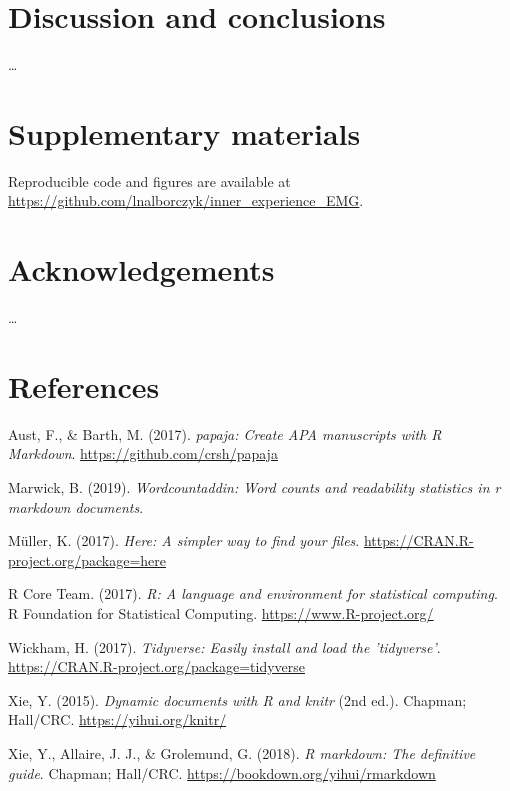 \documentclass[
  english,
  man,floatsintext]{apa6}
\newlength{\cslhangindent}
\newenvironment{cslreferences}%
  {\setlength{\parindent}{0pt}%
  \everypar{\setlength{\hangindent}{\cslhangindent}}\ignorespaces}%
  {\par}
\begin{document}
\hypertarget{discussion-and-conclusions}{%
\section{Discussion and conclusions}\label{discussion-and-conclusions}}

\ldots{}

\hypertarget{supp}{%
\section{Supplementary materials}\label{supp}}

Reproducible code and figures are available at \url{https://github.com/lnalborczyk/inner_experience_EMG}.

\hypertarget{acknowledgements}{%
\section*{Acknowledgements}\label{acknowledgements}}

\ldots{}

\hypertarget{references}{%
\section*{References}\label{references}}

\hypertarget{refs}{}
\begin{cslreferences}
\leavevmode\hypertarget{ref-R-papaja}{}%
Aust, F., \& Barth, M. (2017). \emph{papaja: Create APA manuscripts with R Markdown}. \url{https://github.com/crsh/papaja}

\leavevmode\hypertarget{ref-R-wordcountaddin}{}%
Marwick, B. (2019). \emph{Wordcountaddin: Word counts and readability statistics in r markdown documents}.

\leavevmode\hypertarget{ref-R-here}{}%
Müller, K. (2017). \emph{Here: A simpler way to find your files}. \url{https://CRAN.R-project.org/package=here}

\leavevmode\hypertarget{ref-R-base}{}%
R Core Team. (2017). \emph{R: A language and environment for statistical computing}. R Foundation for Statistical Computing. \url{https://www.R-project.org/}

\leavevmode\hypertarget{ref-R-tidyverse}{}%
Wickham, H. (2017). \emph{Tidyverse: Easily install and load the 'tidyverse'}. \url{https://CRAN.R-project.org/package=tidyverse}

\leavevmode\hypertarget{ref-R-knitr}{}%
Xie, Y. (2015). \emph{Dynamic documents with R and knitr} (2nd ed.). Chapman; Hall/CRC. \url{https://yihui.org/knitr/}

\leavevmode\hypertarget{ref-R-rmarkdown}{}%
Xie, Y., Allaire, J. J., \& Grolemund, G. (2018). \emph{R markdown: The definitive guide}. Chapman; Hall/CRC. \url{https://bookdown.org/yihui/rmarkdown}
\end{cslreferences}
\end{document}
